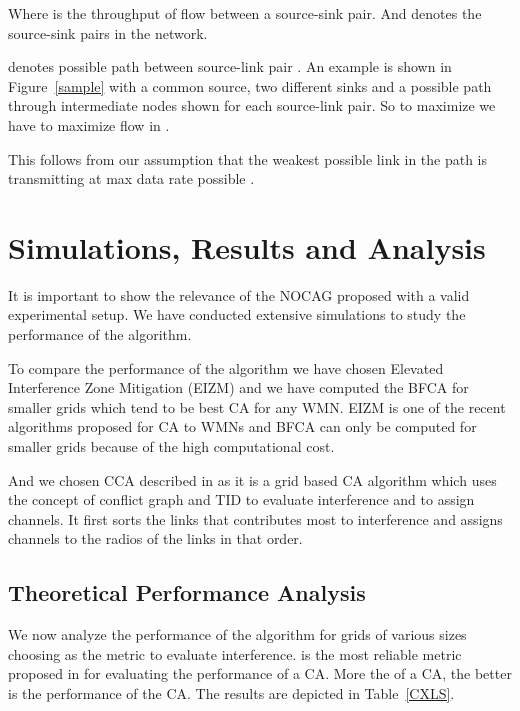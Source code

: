 \documentclass[conference]{IEEEtran}
\begin{document}
Where  is the throughput of flow between a source-sink pair. And   denotes the source-sink pairs in the network.

 denotes  possible path between source-link pair .
An example  is shown in Figure~\ref{sample} with a common source, two different sinks and a possible path through intermediate nodes shown for each source-link pair.
So to maximize  we have to maximize flow in .



This follows from our assumption that
the weakest possible link in the path is transmitting at max data rate possible \cite{ahlswede2000network}.




\section{Simulations, Results and Analysis}
It is important to show the relevance of the NOCAG proposed with a valid experimental setup. 
We have conducted extensive simulations to study the performance of the algorithm.

To compare the performance of the algorithm we have chosen Elevated Interference Zone Mitigation (EIZM) \cite{kala2015radio} 
and we have computed the BFCA for smaller grids which tend to be best CA  for any WMN. 
EIZM is one of the recent algorithms proposed for CA to WMNs and BFCA can only be computed for smaller grids because of the high computational cost. 

And we chosen CCA described in \cite{raniwala2004centralized} as it is a grid based CA algorithm which uses the concept of conflict graph and 
TID \cite{22Ramachandran} to evaluate interference and to assign channels. 
It first sorts the links that contributes most to interference and assigns channels to the radios of the links in that order.  


\subsection{Theoretical Performance Analysis}
We now analyze the performance of the algorithm for grids of various sizes choosing  as the metric to evaluate interference.
 is the most reliable metric proposed in \cite{kala2015reliable} for evaluating the performance of a CA. 
More the  of a CA, the better is the performance of the CA.
The results are depicted in Table~\ref{CXLS}. 
\end{document}
